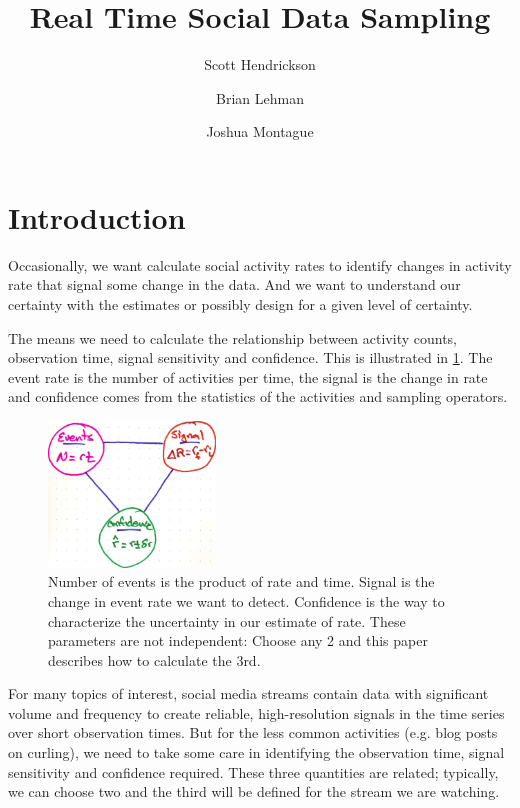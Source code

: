 \documentclass{article}
\title{Real Time Social Data Sampling }
\author[]{Scott Hendrickson}
\author[]{Brian Lehman}
\author[]{Joshua Montague}
\affil[]{ \Large{Gnip, Inc.} }
\begin{document}
\maketitle

\section{Introduction}

Occasionally, we want calculate social activity rates to identify changes in activity rate that signal some change in the data.  And we want to
understand our certainty with the estimates or possibly design for a given level of certainty.

The means we need to calculate the relationship between activity counts, observation time, signal sensitivity and confidence. This is illustrated in \ref{fig:tradeoff}. The event rate is the number of activities per time, the signal is the change in rate and confidence comes from the statistics of the activities and sampling operators.

%
\begin{figure}[h]
	\begin{center}
		\includegraphics[width=1.75in]{./imgs/tradeoff.jpg}
	\end{center}
	\caption{Number of events is the product of rate and time. Signal is the change in event rate we want to detect.  Confidence is the way to characterize the
	uncertainty in our estimate of rate.  These parameters are not independent: Choose any 2 and this paper describes how to calculate the 3rd. }
    	\label{fig:tradeoff}
\end{figure}
%
%

For many topics of interest, social media streams contain data with significant volume and frequency to create reliable, high-resolution signals in the time series over short observation times.  But for the less common activities (e.g. blog posts on curling), we need to take some care in identifying the observation time, signal sensitivity and confidence required. These three quantities are related; typically, we can choose two and the third will be defined for the stream we are watching.
\end{document}
